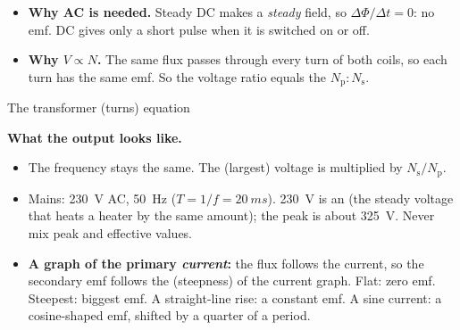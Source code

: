 \begin{sidebyside}[0.58]
  \label{ch4:fig:transformer}
\nextside
  \begin{itemize}
    \item \textbf{Why AC is needed.} Steady DC makes a \emph{steady} field, so
          $\Delta\Phi/\Delta t = 0$: no emf. DC gives only a short pulse when it is
          switched on or off.
    \item \textbf{Why $V \propto N$.} The same flux passes through every turn of both
          coils, so each turn has the same emf. So the voltage ratio equals the
           $N_\mathrm{p} : N_\mathrm{s}$.
  \end{itemize}
\end{sidebyside}

\begin{formulacard}{The transformer (turns) equation}
  \begin{symbols}
  \end{symbols}
\end{formulacard}

\textbf{What the output looks like.}
\begin{itemize}
  \item The frequency stays the same. The  (largest) voltage is multiplied by
        $N_\mathrm{s}/N_\mathrm{p}$.
  \item Mains: \qty{230}{V} AC, \qty{50}{Hz} ($T = 1/f = \qty{20}{ms}$). \qty{230}{V} is an
         (the steady voltage that heats a heater by the same amount);
        the peak is about \qty{325}{V}. Never mix peak and effective values.
  \item \textbf{A graph of the primary \emph{current}:} the flux follows the current, so
        the secondary emf follows the  (steepness) of the current graph.
        Flat: zero emf. Steepest: biggest emf. A straight-line rise: a constant emf. A sine
        current: a cosine-shaped emf, shifted by a quarter of a period.
\end{itemize}


